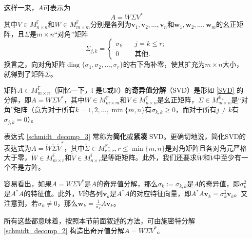 这样一来，$A$可表示为
\begin{equation}\label{SVD}
    A=W\Sigma V^*
\end{equation}
其中$V\in M_{n\times n}^{\mathbb{F}}$和$W\in M_{m\times m}^{\mathbb{F}}$分别是各列为$\mathbf{v}_{1},\mathbf{v}_{2},\ldots,\mathbf{v}_{n}$和\linebreak $\mathbf{w}_{1},\mathbf{w}_{2},\ldots,\mathbf{w}_{m}$的幺正矩阵，且$\Sigma$是$m\times n$“对角”矩阵
\begin{equation}\label{SVD_diag}
    \Sigma_{j,k}=\left\{\begin{array}{ll}{\sigma_{k}}&{\quad j=k\leq r;}\\{0}&{\quad\text{其他}.}\end{array}\right.
\end{equation}
换言之，向对角矩阵$\operatorname{diag}\{\sigma_1,\sigma_2,\dots,\sigma_r\}$的右下角补零，使其扩充为$m\times n$大小，就得到了矩阵$\Sigma$。

\begin{definition}
    矩阵$A\in M_{m\times n}^{\mathbb{F}}$（回忆一下，$\mathbb{F}$是$\mathbb{C}$或$\mathbb{R}$）的{\bf 奇异值分解}（SVD）是形如 \eqref{SVD} 的分解，即$A=W\Sigma V^*$，其中$W\in M_{m\times m}^{\mathbb{F}}$和$V\in M_{n\times n}^{\mathbb{F}}$是幺正矩阵，$\Sigma\in M_{m\times n}^{\mathbb{R}_+}$是“对角”矩阵（意为对于所有$k=1,2,\dots,\min\{m,n\}$有$\sigma_{k,k}\ge 0$，而对于所有$j\ne k$有$\sigma_{j,k}=0$）。

    表达式 \eqref{schmidt_decomp_3} 常称为{\bf 简化}或{\bf 紧凑} SVD。更确切地说，简化SVD的表达式为$A=\widetilde{W}\widetilde{\Sigma}\widetilde{V}^*$，其中$\widetilde{\Sigma}\in M_{r\times r}^{\mathbb{R}_+},r\le\min\{m,n\}$是对角矩阵且各对角元严格大于零，$\widetilde{W}\in M_{m\times r}^{\mathbb{F}}$和$\widetilde{V}\in M_{n\times r}^{\mathbb{F}}$是等距矩阵。此外，我们还要求$\widetilde{W}$和$\widetilde{V}$中至少有一个不是方阵。
\end{definition}

\begin{remark}
    容易看出，如果$A=W\Sigma V^*$是$A$的奇异值分解，那么$\sigma_k:=\sigma_{k,k}$是$A$的奇异值，即$\sigma_k^2$是$A^*A$的特征值。此外，$V$的各列$\mathbf{v}_k$是$A^*A$的对应特征向量，即$A^{*}A\mathbf{v}_{k}=\sigma_{k}^{2}\mathbf{v}_{k}$。又注意到，若$\sigma_k\ne 0$，那么$\mathbf{w}_k=\frac{1}{\sigma_k}A\mathbf{v}_k$。

    所有这些都意味着，按照本节前面叙述的方法，可由施密特分解 \eqref{schmidt_decomp_2} 构造出奇异值分解$A=W\Sigma V^*$。
\end{remark}

